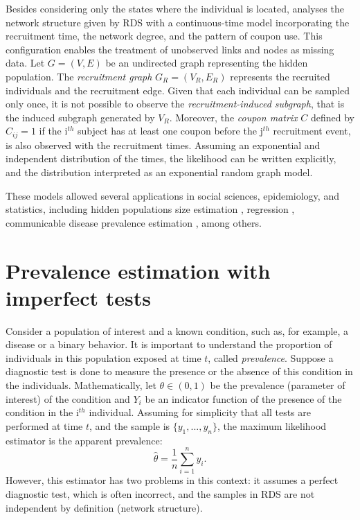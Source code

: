 Besides considering only the states where the individual is located,
\cite{crawford2016} analyses the network structure given by RDS with a
continuous-time model incorporating the recruitment time, the network degree,
and the pattern of coupon use. This configuration enables the treatment of
unobserved links and nodes as missing data. Let $G = (V,E)$ be an undirected
graph representing the hidden population. The {\em recruitment graph} $G_R =
(V_R, E_R)$ represents the recruited individuals and the recruitment edge.
Given that each individual can be sampled only once, it is not possible to
observe the {\em recruitment-induced subgraph}, that is the induced subgraph
generated by $V_R$. Moreover, the {\em coupon matrix} $C$ defined by $C_{ij} =
1$ if the i$^{th}$ subject has at least one coupon before the j$^{th}$
recruitment event, is also observed with the recruitment times. Assuming an
exponential and independent distribution of the times, the likelihood can be
written explicitly, and the distribution interpreted as an exponential random graph
model. 

These models allowed several applications in social sciences, epidemiology,
and statistics, including hidden populations size estimation
\cite{crawford2018hidden}, regression \cite{bastos2012binary}, communicable
disease prevalence estimation \cite{albuquerque2009avaliaccao}, among others. 

\section{Prevalence estimation with imperfect tests}

Consider a population of interest and a known condition, such as, for example,
a disease or a binary behavior. It is important to understand the proportion
of individuals in this population exposed at time $t$, called {\em
prevalence}. Suppose a diagnostic test is done to measure the presence or the
absence of this condition in the individuals. Mathematically, let $\theta \in
(0,1)$ be the prevalence (parameter of interest) of the condition and $Y_i$ be an indicator function of the presence of the condition in the i$^{th}$ individual.
Assuming for simplicity that all tests are performed at time $t$, and the
sample is $\{y_1, ..., y_n\}$, the maximum likelihood estimator is the
apparent prevalence: 
\begin{equation}
    \label{eq:naive-estimator}
    \hat{\theta} = \frac{1}{n}\sum_{i=1}^n y_i.
\end{equation}
However, this estimator has two problems in this context: it assumes a perfect
diagnostic test, which is often incorrect, and the samples in RDS are not
independent by definition (network structure). 

